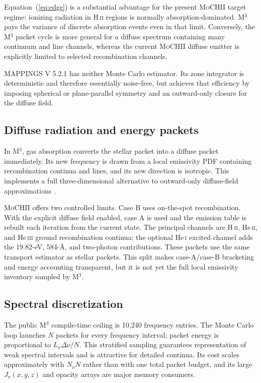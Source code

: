 \documentclass[english,a4paper]{my_memo}
\newcommand{\MoCHII}{\textsc{MoCHII}}
\newcommand{\Mthree}{M$^3$}
\newcommand{\Mappings}{MAPPINGS V 5.2.1}
\begin{document}
Equation~(\ref{eq:edge}) is a substantial advantage for the present
\MoCHII{} target regime: ionizing radiation in H\,\textsc{ii} regions is
normally absorption-dominated.  \Mthree{} pays the variance of discrete
absorption events even in that limit.  Conversely, the \Mthree{} packet
cycle is more general for a diffuse spectrum containing many continuum and
line channels, whereas the current \MoCHII{} diffuse emitter is explicitly
limited to selected recombination channels.

\Mappings{} has neither Monte Carlo estimator.  Its zone integrator is
deterministic and therefore essentially noise-free, but achieves that
efficiency by imposing spherical or plane-parallel symmetry and an
outward-only closure for the diffuse field.

\subsection{Diffuse radiation and energy packets}

In \Mthree{}, gas absorption converts the stellar packet into a diffuse
packet immediately.  Its new frequency is drawn from a local emissivity
PDF containing recombination continua and lines, and its new direction is
isotropic.  This implements a full three-dimensional alternative to
outward-only diffuse-field approximations \cite{jin2022}.

\MoCHII{} offers two controlled limits.  Case B uses on-the-spot
recombination.  With the explicit diffuse field enabled, case A is used
and the emission table is rebuilt each iteration from the current state.
The principal channels are H\,\textsc{ii}, He\,\textsc{ii}, and
He\,\textsc{iii} ground recombination continua; the optional He\,\textsc{i}
excited channel adds the 19.82-eV, 584-\AA{}, and two-photon contributions.
These packets use the same transport estimator as stellar packets.  This
split makes case-A/case-B bracketing and energy accounting transparent,
but it is not yet the full local emissivity inventory sampled by \Mthree{}.

\subsection{Spectral discretization}

The public \Mthree{} compile-time ceiling is 10,240 frequency entries.
The Monte Carlo loop launches $N$ packets for every frequency interval;
packet energy is proportional to $L_\nu\Delta\nu/N$.  This stratified
sampling guarantees representation of weak spectral intervals and is
attractive for detailed continua.  Its cost scales approximately with
$N_\nu N$ rather than with one total packet budget, and its large
$J_\nu(x,y,z)$ and opacity arrays are major memory consumers.
\end{document}
